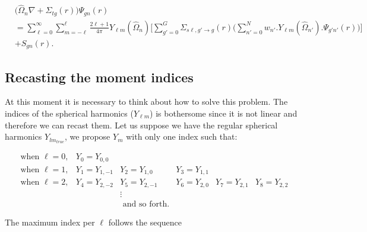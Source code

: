 \documentclass[11pt,letterpaper,titlepage]{article}
\numberwithin{equation}{section}
\begin{document}
\begin{equation} \label{eq:SNequations}
\begin{aligned}
&\biggr(\hat{\Omega}_n\nabla +\Sigma_{tg} (r)\biggr)  \Psi_{gn} (r)\\
&= \sum_{\ell=0}^{\infty}\sum_{m=-\ell}^{\ell} \frac{2\ell+1}{4\pi}Y_{\ell m}(\hat{\Omega}_n)
\biggr[ \sum_{g'=0}^{G}
\Sigma_{s\ell,g'{\to}g} (r)
\biggr(
\sum_{n'=0}^{N} w_{n'} . Y_{\ell m}(\hat{\Omega}_{n'}).\Psi_{g'n'}(r) 
\biggr)
\biggr]\\
&+  S_{gn} (r).
\end{aligned}
\end{equation}



\vspace{1cm}
\subsection{Recasting the moment indices}
At this moment it is necessary to think about how to solve this problem. The indices of the spherical harmonics ($Y_{\ell m}$) is bothersome since it is not linear and therefore we can recast them. Let us suppose we have the regular spherical harmonics $Y_{lm_{true}}$, we propose $Y_{m}$ with only one index such that:

\begin{equation*}
\begin{matrix}
\text{when }\ell=0,  &Y_0 = Y_{0,0} \\
\text{when }\ell=1,  &Y_1 = Y_{1,-1} &Y_2 = Y_{1,0} &Y_3 = Y_{1,1} \\
\text{when }\ell=2,  &Y_4 = Y_{2,-2} &Y_5 = Y_{2,-1} &Y_6 = Y_{2,0} &Y_7 = Y_{2,1} & Y_8 = Y_{2,2}\\
        &               &\vdots \\
        &               &\text{ and so forth}.
\end{matrix}
\end{equation*}

\noindent The maximum index per $\ell$ follows the sequence
\end{document}
